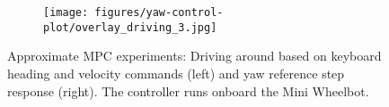 \begin{figure}[tb]
    \newcommand{\photoheight}{1.2in}
    \newcommand{\plotwidth}{1.65in}
    \newcommand{\plotheight}{1.4in}
    \centering
    \begin{subfigure}[t]{1.6in}
        \centering
        \texttt{[image: figures/yaw-control-plot/overlay\_driving\_3.jpg]}
    \end{subfigure}
    \begin{subfigure}[t]{1.6in}
        \centering
        
    \end{subfigure}
    \par\medskip %
    \begin{subfigure}[t]{1.4in}
        \centering
        
    \end{subfigure}\hspace{0.2in}
    \begin{subfigure}[t]{1.6in}
        
    \end{subfigure}
    \caption{Approximate MPC experiments: Driving around based on keyboard heading and velocity commands (left) and yaw reference step response (right).
    The controller runs onboard the Mini Wheelbot.
    }
    \label{fig:mpcexperiments}
\end{figure}
